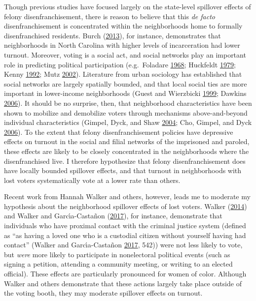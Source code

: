 \documentclass[12pt,]{article}
\begin{document}
Though previous studies have focused largely on the state-level spillover effects of felony disenfranchisement, there is reason to believe that this \emph{de facto} disenfranchisement is concentrated within the neighborhoods home to formally disenfranchised residents. Burch (\protect\hyperlink{ref-Burch2013}{2013}), for instance, demonstrates that neighborhoods in North Carolina with higher levels of incarceration had lower turnout. Moreover, voting is a social act, and social networks play an important role in predicting political participation (e.g.~Foladare \protect\hyperlink{ref-Foladare1968}{1968}; Huckfeldt \protect\hyperlink{ref-Huckfeldt1979}{1979}; Kenny \protect\hyperlink{ref-Kenny1992}{1992}; Mutz \protect\hyperlink{ref-Mutz2002}{2002}). Literature from urban sociology has established that social networks are largely spatially bounded, and that local social ties are more important in lower-income neighborhoods (Guest and Wierzbicki \protect\hyperlink{ref-Guest1999}{1999}; Dawkins \protect\hyperlink{ref-Dawkins2006}{2006}). It should be no surprise, then, that neighborhood characteristics have been shown to mobilize and demobilize voters through mechanisms above-and-beyond individual characteristics (Gimpel, Dyck, and Shaw \protect\hyperlink{ref-Gimpel2004}{2004}; Cho, Gimpel, and Dyck \protect\hyperlink{ref-Cho2006}{2006}). To the extent that felony disenfranchisement policies have depressive effects on turnout in the social and filial networks of the imprisoned and paroled, these effects are likely to be closely concentrated in the neighborhoods where the disenfranchised live. I therefore hypothesize that felony disenfranchisement does have locally bounded spillover effects, and that turnout in neighborhoods with lost voters systematically vote at a lower rate than others.

Recent work from Hannah Walker and others, however, leads me to moderate my hypothesis about the neighborhood spillover effects of lost voters. Walker (\protect\hyperlink{ref-Walker2014}{2014}) and Walker and Garcı́a-Castañon (\protect\hyperlink{ref-Walker2017}{2017}), for instance, demonstrate that individuals who have proximal contact with the criminal justice system (defined as ``as having a loved one who is a custodial citizen without yourself having had contact'' (Walker and Garcı́a-Castañon \protect\hyperlink{ref-Walker2017}{2017}, 542)) were not less likely to vote, but \emph{were} more likely to participate in nonelectoral political events (such as signing a petition, attending a community meeting, or writing to an elected official). These effects are particularly pronounced for women of color. Although Walker and others demonstrate that these actions largely take place outside of the voting booth, they may moderate spillover effects on turnout.
\end{document}
